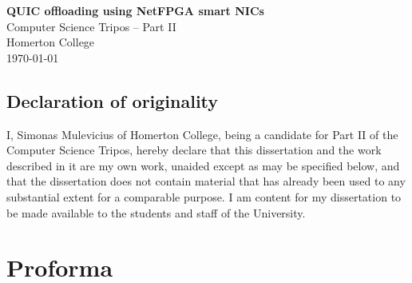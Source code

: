 \documentclass[12pt,a4paper,twoside,openright]{report}
\begin{document}





\pagestyle{empty}


\vspace*{60mm}
\begin{center}
\Huge
\textbf{QUIC offloading using NetFPGA smart NICs} \\[5mm]
Computer Science Tripos -- Part II \\[5mm]
Homerton College \\[5mm]
\today  %
\end{center}








\newpage



\section*{Declaration of originality}

I, Simonas Mulevicius of Homerton College, being a candidate for Part II of the Computer
Science Tripos, hereby declare
that this dissertation and the work described in it are my own work,
unaided except as may be specified below, and that the dissertation
does not contain material that has already been used to any substantial
extent for a comparable purpose. I am content for my dissertation to
be made available to the students and staff of the University.

\bigskip
{}

\medskip
{}


\newpage











\pagestyle{plain}

\chapter*{Proforma}
\end{document}
